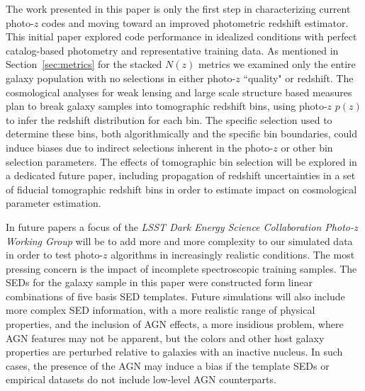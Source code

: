 The work presented in this paper is only the first step in characterizing current photo-$z$ codes and moving toward an improved photometric redshift estimator.
This initial paper explored code performance in idealized conditions with perfect catalog-based photometry and representative training data.
As mentioned in Section~\ref{sec:metrics} for the stacked $N(z)$ metrics we examined only the entire galaxy population with no selections in either photo-$z$ ``quality" or redshift.
The cosmological analyses for weak lensing and large scale structure based measures plan to break galaxy samples into tomographic redshift bins, using photo-$z$ $p(z)$ to infer the redshift distribution for each bin.
The specific selection used to determine these bins, both algorithmically and the specific bin boundaries, could induce biases due to indirect selections inherent in the photo-$z$ or other bin selection parameters.
The effects of tomographic bin selection will be explored in a dedicated future paper, including propagation of redshift uncertainties in a set of fiducial tomographic redshift bins in order to estimate impact on cosmological parameter estimation.


In future papers a focus of the {\it LSST Dark Energy Science Collaboration Photo-z Working Group} will be to add more and more complexity to our simulated data in order to test photo-$z$ algorithms in increasingly realistic conditions.
The most pressing concern is the impact of incomplete spectroscopic training samples.
The SEDs for the galaxy sample in this paper were constructed form linear combinations of five basis SED templates.
Future simulations will also include more complex SED information, with a more realistic range of physical properties, and the inclusion of AGN effects, a more insidious problem, where AGN features may not be apparent, but the colors and other host galaxy properties are perturbed relative to galaxies with an inactive nucleus.
In such cases, the presence of the AGN may induce a bias if the template SEDs or empirical datasets do not include low-level AGN counterparts.

